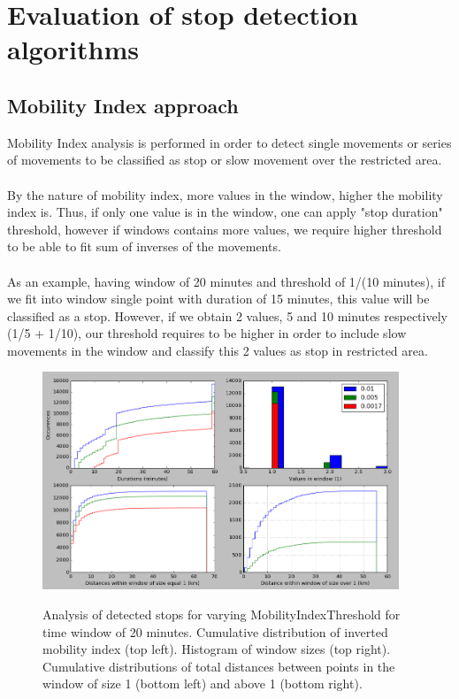 \section{Evaluation of stop detection algorithms}

\subsection{Mobility Index approach}

Mobility Index analysis is performed in order to detect single movements or series of movements to be classified as stop or slow movement over the restricted area. 
\\\\
By the nature of mobility index, more values in the window, higher the mobility index is. Thus, if only one value is in the window, one can apply "stop duration" threshold, however if windows contains more values, we require higher threshold to be able to fit sum of inverses of the movements. 
\\\\
As an example, having window of 20 minutes and threshold of 1/(10 minutes), if we fit into window single point with duration of 15 minutes, this value will be classified as a stop. However, if we obtain 2 values, 5 and 10 minutes respectively (1/5 + 1/10), our threshold requires to be higher in order to include slow movements in the window and classify this 2 values as stop in restricted area.

\begin{figure}[!ht]
	\centering
	\includegraphics[width=0.95\textwidth]{images/mob_index_analy1.png}\\
	\caption{ Analysis of detected stops for varying MobilityIndexThreshold for time window of 20 minutes. Cumulative distribution of inverted mobility index (top left). Histogram of window sizes (top right). Cumulative distributions of total distances between points in the window of size 1 (bottom left) and above 1 (bottom right). }
	\label{fig:mob_index_analy1}
\end{figure}
\FloatBarrier

